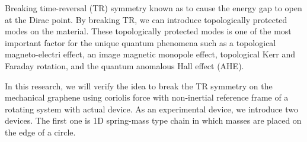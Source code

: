 \documentclass[../main.tex]{subfiles}
\begin{document}
Breaking time-reversal (TR) symmetry known as to cause the energy gap to open
at the Dirac point\cite{lee}. 
By breaking TR, we can introduce topologically protected modes on the material.
These topologically protected modes is one of the most important factor for the unique quantum
phenomena such as a topological magneto-electri effect, an image
magnetic monopole effect, topological Kerr and Faraday rotation, and the
quantum anomalous Hall effect (AHE)\cite{lee}.

In this research, we will verify the idea to break the TR symmetry on the
mechanical graphene using coriolis force with non-inertial reference frame of
a rotating system with actual device\cite{kariyado,wang}.
As an experimental device, we introduce two devices. The first one is 1D spring-mass type
chain in which masses are placed on the edge of a circle.
\end{document}
